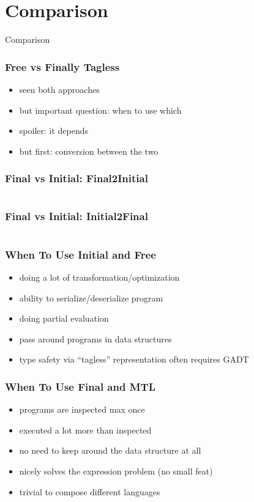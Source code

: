 \documentclass[aspectratio=169, hyperref={colorlinks, linkcolor=beamer@centricgreen}, urlcolor=links]{beamer}
\begin{document}
\section{Comparison}\label{sec:comparison}

\begin{frame}
  \begin{center}
    \Huge
    Comparison
  \end{center}
\end{frame}

\begin{frame}
  \frametitle{Free vs Finally Tagless}
  \begin{itemize}
  \item seen both approaches
  \item but important question: when to use which
  \item spoiler: it depends
  \item but first: conversion between the two
  \end{itemize}
\end{frame}

\begin{frame}[fragile]
  \frametitle{Final vs Initial: Final2Initial}
  \inputminted[fontsize=\footnotesize]{scala}{snippets/final-to-initial.scala}
\end{frame}

\begin{frame}[fragile]
  \frametitle{Final vs Initial: Initial2Final}
  \inputminted[fontsize=\footnotesize]{scala}{snippets/initial-to-final.scala}
\end{frame}

\begin{frame}
  \frametitle{When To Use Initial and Free}
  \begin{itemize}
  \item doing a lot of transformation/optimization
  \item ability to serialize/deserialize program
  \item doing partial evaluation
  \item pass around programs in data structures
  \item type safety via ``tagless'' representation often requires GADT
  \end{itemize}
\end{frame}

\begin{frame}
  \frametitle{When To Use Final and MTL}
  \begin{itemize}
  \item programs are inspected max once
  \item executed a lot more than inspected
  \item no need to keep around the data structure at all
  \item nicely solves the expression problem (no small feat)
  \item trivial to compose different languages
  \end{itemize}
\end{frame}
\end{document}
